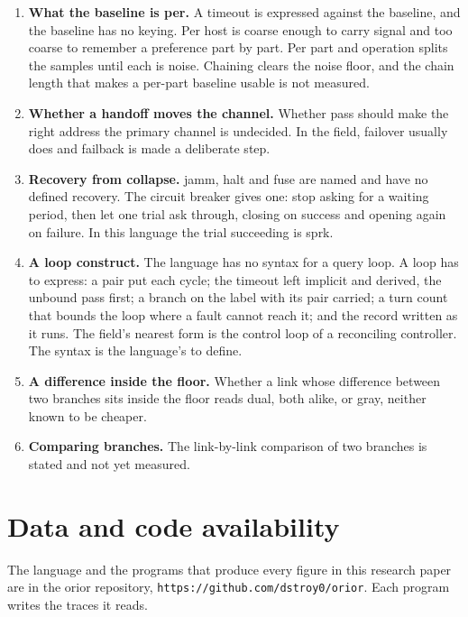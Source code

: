 \begin{enumerate}
\item \textbf{What the baseline is per.} A timeout is expressed against the baseline, and the
  baseline has no keying. Per host is coarse enough to carry signal and too coarse to remember a
  preference part by part. Per part and operation splits the samples until each is noise.
  Chaining clears the noise floor, and the chain length that makes a per-part baseline usable is
  not measured.
\item \textbf{Whether a handoff moves the channel.} Whether pass should make the right address
  the primary channel is undecided. In the field, failover usually does and failback is made a
  deliberate step.
\item \textbf{Recovery from collapse.} jamm, halt and fuse are named and have no defined
  recovery. The circuit breaker \cite{src:Nygard} gives one: stop asking for a waiting period,
  then let one trial ask through, closing on success and opening again on failure. In this
  language the trial succeeding is sprk.
\item \textbf{A loop construct.} The language has no syntax for a query loop. A loop has to
  express: a pair put each cycle; the timeout left implicit and derived, the unbound pass first;
  a branch on the label with its pair carried; a turn count that bounds the loop where a fault
  cannot reach it; and the record written as it runs. The field's nearest form is the control
  loop of a reconciling controller. The syntax is the language's to define.
\item \textbf{A difference inside the floor.} Whether a link whose difference between two
  branches sits inside the floor reads dual, both alike, or gray, neither known to be cheaper.
\item \textbf{Comparing branches.} The link-by-link comparison of two branches is stated and not
  yet measured.
\end{enumerate}

\section{Data and code availability}

The language and the programs that produce every figure in this research paper are in the orior
repository, \texttt{https://github.com/dstroy0/orior}. Each program writes the traces it reads.
